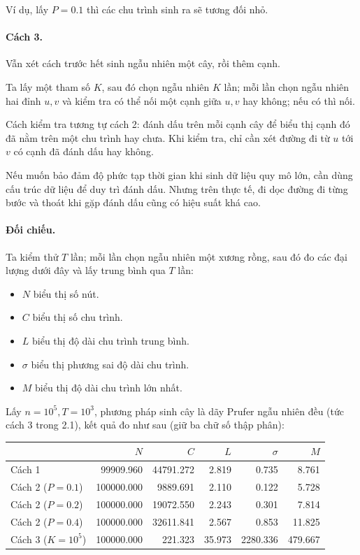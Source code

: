 \documentclass[11pt]{article}
\begin{document}
Ví dụ, lấy $P=0.1$ thì các chu trình sinh ra sẽ tương đối nhỏ.

\paragraph{Cách 3.}
Vẫn xét cách trước hết sinh ngẫu nhiên một cây, rồi thêm cạnh.

Ta lấy một tham số $K$, sau đó chọn ngẫu nhiên $K$ lần; mỗi lần chọn ngẫu nhiên
hai đỉnh $u,v$ và kiểm tra có thể nối một cạnh giữa $u,v$ hay không; nếu có thì
nối.

Cách kiểm tra tương tự cách 2: đánh dấu trên mỗi cạnh cây để biểu thị cạnh đó
đã nằm trên một chu trình hay chưa. Khi kiểm tra, chỉ cần xét đường đi từ $u$
tới $v$ có cạnh đã đánh dấu hay không.

Nếu muốn bảo đảm độ phức tạp thời gian khi sinh dữ liệu quy mô lớn, cần dùng
cấu trúc dữ liệu để duy trì đánh dấu. Nhưng trên thực tế, đi dọc đường đi từng
bước và thoát khi gặp đánh dấu cũng có hiệu suất khá cao.

\paragraph{Đối chiếu.}
Ta kiểm thử $T$ lần; mỗi lần chọn ngẫu nhiên một xương rồng, sau đó đo các đại
lượng dưới đây và lấy trung bình qua $T$ lần:

\begin{itemize}
  \item $N$ biểu thị số nút.
  \item $C$ biểu thị số chu trình.
  \item $L$ biểu thị độ dài chu trình trung bình.
  \item $\sigma$ biểu thị phương sai độ dài chu trình.
  \item $M$ biểu thị độ dài chu trình lớn nhất.
\end{itemize}

Lấy $n=10^5,T=10^3$, phương pháp sinh cây là dãy Prufer ngẫu nhiên đều (tức
cách 3 trong 2.1), kết quả đo như sau (giữ ba chữ số thập phân):

\begin{center}
\scriptsize
\begin{tabular}{lrrrrr}
& $N$ & $C$ & $L$ & $\sigma$ & $M$ \\
\hline
Cách 1 & 99909.960 & 44791.272 & 2.819 & 0.735 & 8.761 \\
Cách 2 ($P=0.1$) & 100000.000 & 9889.691 & 2.110 & 0.122 & 5.728 \\
Cách 2 ($P=0.2$) & 100000.000 & 19072.550 & 2.243 & 0.301 & 7.814 \\
Cách 2 ($P=0.4$) & 100000.000 & 32611.841 & 2.567 & 0.853 & 11.825 \\
Cách 3 ($K=10^5$) & 100000.000 & 221.323 & 35.973 & 2280.336 & 479.667
\end{tabular}
\end{center}
\end{document}

